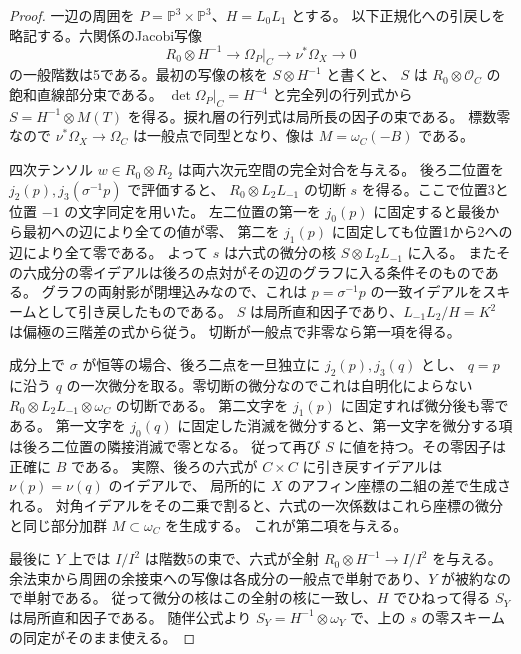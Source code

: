 \begin{proof}
一辺の周囲を $P=\mathbb P^3\times\mathbb P^3$、$H=L_0L_1$ とする。
以下正規化への引戻しを略記する。六関係のJacobi写像
\[
           R_0\otimes H^{-1}\longrightarrow\Omega_P|_C
                          \longrightarrow\nu^*\Omega_X\longrightarrow0
\]
の一般階数は5である。最初の写像の核を $S\otimes H^{-1}$ と書くと、
$S$ は $R_0\otimes\mathcal O_C$ の飽和直線部分束である。
$\det\Omega_P|_C=H^{-4}$ と完全列の行列式から
$S=H^{-1}\otimes M(T)$ を得る。捩れ層の行列式は局所長の因子の束である。
標数零なので $\nu^*\Omega_X\to\Omega_C$ は一般点で同型となり、像は $M=\omega_C(-B)$ である。

四次テンソル $w\in R_0\otimes R_2$ は両六次元空間の完全対合を与える。
後ろ二位置を $j_2(p),j_3(\sigma^{-1}p)$ で評価すると、
$R_0\otimes L_2 L_{-1}$ の切断 $s$ を得る。ここで位置3と位置 $-1$ の文字同定を用いた。
左二位置の第一を $j_0(p)$ に固定すると最後から最初への辺により全ての値が零、
第二を $j_1(p)$ に固定しても位置1から2への辺により全て零である。
よって $s$ は六式の微分の核 $S\otimes L_2L_{-1}$ に入る。
またその六成分の零イデアルは後ろの点対がその辺のグラフに入る条件そのものである。
グラフの両射影が閉埋込みなので、これは $p=\sigma^{-1}p$ の一致イデアルをスキームとして引き戻したものである。
$S$ は局所直和因子であり、$L_{-1}L_2/H=K^2$ は偏極の三階差の式から従う。
切断が一般点で非零なら第一項を得る。

成分上で $\sigma$ が恒等の場合、後ろ二点を一旦独立に $j_2(p),j_3(q)$ とし、
$q=p$ に沿う $q$ の一次微分を取る。零切断の微分なのでこれは自明化によらない
$R_0\otimes L_2 L_{-1}\otimes\omega_C$ の切断である。
第二文字を $j_1(p)$ に固定すれば微分後も零である。
第一文字を $j_0(q)$ に固定した消滅を微分すると、第一文字を微分する項は後ろ二位置の隣接消滅で零となる。
従って再び $S$ に値を持つ。その零因子は正確に $B$ である。
実際、後ろの六式が $C\times C$ に引き戻すイデアルは $\nu(p)=\nu(q)$ のイデアルで、
局所的に $X$ のアフィン座標の二組の差で生成される。
対角イデアルをその二乗で割ると、六式の一次係数はこれら座標の微分と同じ部分加群 $M\subset\omega_C$ を生成する。
これが第二項を与える。

最後に $Y$ 上では $I/I^2$ は階数5の束で、六式が全射
$R_0\otimes H^{-1}\to I/I^2$ を与える。
余法束から周囲の余接束への写像は各成分の一般点で単射であり、$Y$ が被約なので単射である。
従って微分の核はこの全射の核に一致し、$H$ でひねって得る $S_Y$ は局所直和因子である。
随伴公式より $S_Y=H^{-1}\otimes\omega_Y$ で、上の $s$ の零スキームの同定がそのまま使える。
\end{proof}

